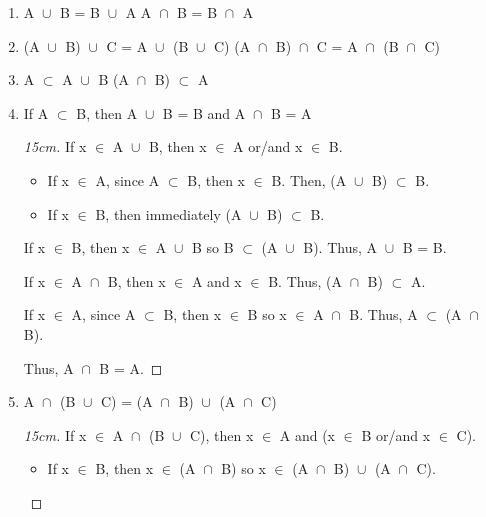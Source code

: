 	\begin{enumerate}[label=(\alph*), leftmargin=2cm, itemsep=0.1cm]
		\item A $\cup_{}^{}$ B = B $\cup_{}^{}$ A
			\hspace{4cm} A $\cap_{}^{}$ B = B $\cap_{}^{}$ A

		\item (A $\cup_{}^{}$ B) $\cup_{}^{}$ C = A $\cup_{}^{}$ (B $\cup_{}^{}$ C)
			\hspace{1.6cm} (A $\cap_{}^{}$ B) $\cap_{}^{}$ C
			= A $\cap_{}^{}$ (B $\cap_{}^{}$ C)

		\item A $\subset$ A $\cup_{}^{}$ B
			\hspace{4.8cm} (A $\cap_{}^{}$ B) $\subset$ A

		\item If A $\subset$ B, then A $\cup_{}^{}$ B = B and A $\cap_{}^{}$ B = A

			\begin{proof}[15cm]
				If x $\in$ A $\cup_{}^{}$ B, then x $\in$ A or/and x $\in$ B.
				\begin{itemize}[leftmargin=1cm, itemsep=0.2cm]
					\item If x $\in$ A, since A $\subset$ B, then x $\in$ B.
						Then, (A $\cup_{}^{}$ B) $\subset$ B.

					\item If x $\in$ B, then immediately (A $\cup_{}^{}$ B) $\subset$ B.
				\end{itemize}
				If x $\in$ B, then x $\in$ A $\cup_{}^{}$ B so B $\subset$ (A $\cup_{}^{}$ B).
				Thus, A $\cup_{}^{}$ B = B.

				\vspace{0.5cm}

				If x $\in$ A $\cap_{}^{}$ B, then x $\in$ A and x $\in$ B.
				Thus, (A $\cap_{}^{}$ B) $\subset$ A.

				If x $\in$ A, since A $\subset$ B, then x $\in$ B so x $\in$ A $\cap_{}^{}$ B.
				Thus, A $\subset$ (A $\cap_{}^{}$ B).

				Thus, A $\cap_{}^{}$ B = A.
			\end{proof}

		\item A $\cap_{}^{}$ (B $\cup_{}^{}$ C)
			= (A $\cap_{}^{}$ B) $\cup_{}^{}$ (A $\cap_{}^{}$ C)

			\begin{proof}[15cm]
				If x $\in$ A $\cap_{}^{}$ (B $\cup_{}^{}$ C), then x $\in$ A
				and (x $\in$ B or/and x $\in$ C).
				\begin{itemize}[leftmargin=1cm, itemsep=0.1cm]
					\item If x $\in$ B, then x $\in$ (A $\cap_{}^{}$ B) so
						x $\in$ (A $\cap_{}^{}$ B) $\cup_{}^{}$ (A $\cap_{}^{}$ C).


\end{itemize}
\end{proof}
\end{enumerate}
